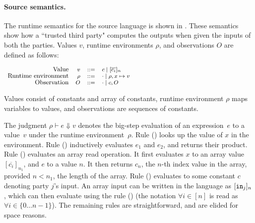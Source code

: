 \paragraph{Source semantics.} The runtime semantics for the source language is shown in
. These semantics show how a ``trusted third party" computes the outputs when given the inputs of both the parties. 
 Values $v$, runtime environments $\rho$, and
observations $O$ are defined as follows:

\vspace{0.1cm}
$
\footnotesize
\begin{array}{rrcl}
    \text{\small{Value}} & v &::=& c \mid [\overline{c_{i}}]_{n}\\
    \text{\small{Runtime environment}} & \rho &::=& \cdot \mid \rho,x \mapsto v\\
    \text{\small{Observation}} & O & ::= & \cdot \mid c, O \\
\end{array}
$

\vspace{0.1cm}
Values consist of constants and array of constants, runtime environment
$\rho$ maps variables to values, and observations are sequences of
constants.

The judgment $\rho \vdash e \Downarrow v$ denotes the big-step
evaluation of an expression~$e$ to a value~$v$ under the runtime
environment~$\rho$. Rule ({}) looks up the value of $x$ in
the environment. Rule ({}) inductively evaluates $e_{1}$ and
$e_{2}$, and returns their product. Rule ({})
evaluates an array read operation. It first evaluates $x$ to an array
value $[\overline{c_{i}}]_{n_{1}}$, and $e$ to a  value
$n$. It then returns $c_{n}$, the $n$-th index value in the array,
provided $n < n_{1}$, the length of the array. Rule ({})
evaluates to some constant $c$ denoting party $j$'s input. 
An array input can be written in the
language as $[{\mathtt{in}}_{j}]_{n}$, which can then evaluate using the
rule ({}) (the notation $\forall i \in [n]$ is read
  as $\forall i \in \{0\dots n - 1\}$). The remaining rules are
straightforward, and are elided for space reasons.

